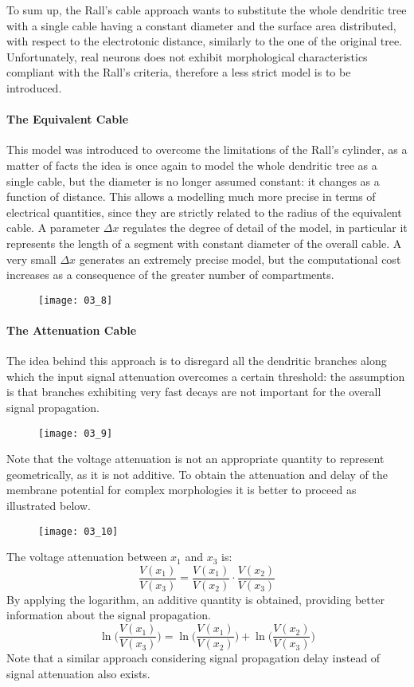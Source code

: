 To sum up, the Rall's cable approach wants to substitute the whole dendritic tree with a single
cable having a constant diameter and the surface area distributed, with respect to the electrotonic
distance, similarly to the one of the original tree. Unfortunately, real neurons does not exhibit
morphological characteristics compliant with the Rall's criteria, therefore a less strict model
is to be introduced.
\paragraph{The Equivalent Cable}
This model was introduced to overcome the limitations of the Rall's cylinder, as a matter of
facts the idea is once again to model the whole dendritic tree as a single cable, but
the diameter is no longer assumed constant: it changes as a function of distance. This allows
a modelling much more precise in terms of electrical quantities, since they are strictly
related to the radius of the equivalent cable. A parameter \(\Delta{x}\) regulates the degree
of detail of the model, in particular it represents the length of a segment with constant
diameter of the overall cable. A very small \(\Delta{x}\) generates an extremely precise model,
but the computational cost increases as a consequence of the greater number of compartments.
\begin{figure}[H]
    \texttt{[image: 03\_8]}
    \centering
\end{figure}
\paragraph{The Attenuation Cable}
The idea behind this approach is to disregard all the dendritic branches along which the
input signal attenuation overcomes a certain threshold: the assumption is that branches
exhibiting very fast decays are not important for the overall signal propagation.
\begin{figure}[H]
    \texttt{[image: 03\_9]}
    \centering
\end{figure}
Note that the voltage attenuation is not an appropriate quantity to represent geometrically,
as it is not additive. To obtain the attenuation and delay of the membrane potential
for complex morphologies it is better to proceed as illustrated below.
\begin{figure}[H]
    \texttt{[image: 03\_10]}
    \centering
\end{figure}
The voltage attenuation between \(x_{1}\) and \(x_{3}\) is:
\begin{equation*}
    \frac{V(x_{1})}{V(x_{3})}=\frac{V(x_{1})}{V(x_{2})}\cdot{\frac{V(x_{2})}{V(x_{3})}}
\end{equation*}
By applying the logarithm, an additive quantity is obtained, providing better information
about the signal propagation.
\begin{equation*}
    \ln{\biggl(\frac{V(x_{1})}{V(x_{3})}\biggr)}=
    \ln{\biggl(\frac{V(x_{1})}{V(x_{2})}\biggr)}+\ln{\biggl(\frac{V(x_{2})}{V(x_{3})}\biggr)}
\end{equation*}
Note that a similar approach considering signal propagation delay instead of signal
attenuation also exists.
